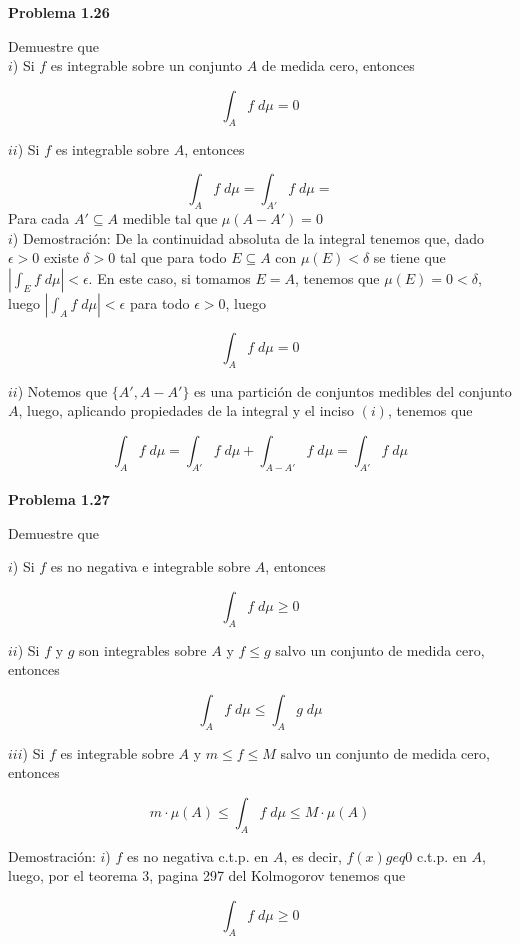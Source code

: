 \documentclass[12pt]{article}
\begin{document}
    \textbf{Problema 1.26}

    Demuestre que 
    \\

    $i$) Si $f$ es integrable sobre un conjunto $A$ de medida cero, entonces

    \[\int_A f\; d\mu = 0\]

    $ii$) Si $f$ es integrable sobre $A$, entonces 

    \[\int_A f\; d\mu = \int_{A'} f\; d\mu = \]
    \hspace*{30pt} Para cada $A'\subseteq A$ medible tal que $\mu(A-A') = 0$
    \\

    $i$) Demostraci\'on: De la continuidad absoluta de la integral tenemos que, dado 
    $\epsilon > 0$ existe $\delta > 0$ tal que para todo $E\subseteq A$ con $\mu(E) < \delta$
    se tiene que $|\int_E f\; d\mu| < \epsilon$. En este caso, si tomamos $E = A$, tenemos 
    que $\mu(E) = 0 < \delta$, luego $|\int_A f\; d\mu| < \epsilon$ para todo $\epsilon > 0$,
    luego

    \[\int_A f\; d\mu = 0\]

    $ii$) Notemos que $\{A', A-A'\}$ es una partici\'on de conjuntos medibles del conjunto 
    $A$, luego, aplicando propiedades de la integral y el inciso $(i)$, tenemos que 
    
    \[\int_A f\; d\mu = \int_{A'} f\; d\mu+\int_{A-A'} f\; d\mu = \int_{A'} f\; d\mu \]
    \\

    \textbf{Problema 1.27}

    Demuestre que 

    $i$) Si $f$ es no negativa e integrable sobre $A$, entonces 

    \[\int_A f\; d\mu \geq 0\]

    $ii$) Si $f$ y $g$ son integrables sobre $A$ y $f \leq g$ salvo un conjunto de medida 
    cero, entonces 

    \[\int_A f\; d\mu \leq \int_A g\; d\mu\]

    $iii$) Si $f$ es integrable sobre $A$ y $m \leq f \leq M$ salvo un conjunto de medida
    cero, entonces 

    \[m\cdot\mu(A) \leq \int_A f\; d\mu  \leq M\cdot\mu(A)\]

    Demostraci\'on: $i$) $f$ es no negativa  c.t.p. en $A$, es decir, $f(x) geq 0$ c.t.p. en 
    $A$, luego, por el teorema 3, pagina 297 del Kolmogorov tenemos que 

    \[\int_A f\; d\mu \geq 0\]
\end{document}
